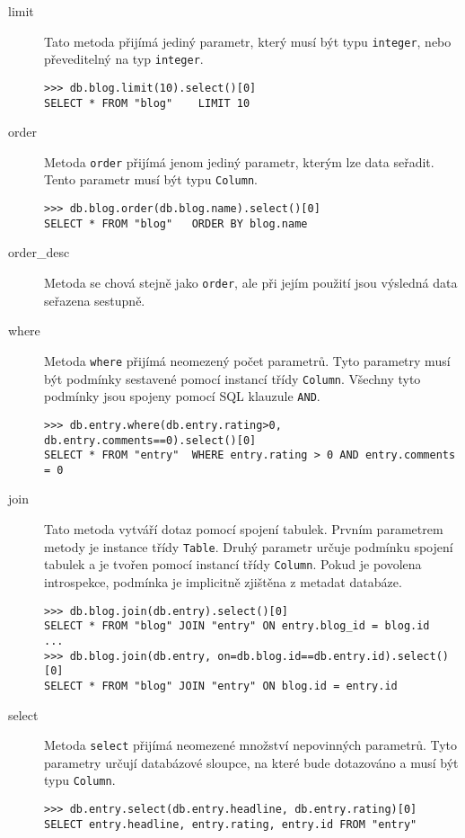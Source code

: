 \documentclass[11pt]{article}
\begin{document}
\begin{description}
\item[limit] Tato metoda přijímá jediný parametr, který musí být typu \lstinline[style=inline]|integer|, nebo převeditelný na typ \lstinline[style=inline]|integer|.
\begin{lstlisting}[style=python]
>>> db.blog.limit(10).select()[0]
SELECT * FROM "blog"    LIMIT 10
\end{lstlisting}
\item[order] Metoda \lstinline[style=inline]|order| přijímá jenom jediný parametr, kterým lze data seřadit. Tento parametr musí být typu \lstinline[style=inline]|Column|. 
\begin{lstlisting}[style=python]
>>> db.blog.order(db.blog.name).select()[0]
SELECT * FROM "blog"   ORDER BY blog.name
\end{lstlisting}
\item[order\_desc] Metoda se chová stejně jako \lstinline[style=inline]|order|, ale při jejím použití jsou výsledná data seřazena sestupně.
\item[where] Metoda \lstinline[style=inline]|where| přijímá neomezený počet parametrů. Tyto parametry musí být podmínky sestavené pomocí instancí třídy \lstinline[style=inline]|Column|. Všechny tyto podmínky jsou spojeny pomocí SQL klauzule \lstinline[style=inline]|AND|.
\begin{lstlisting}[style=python]
>>> db.entry.where(db.entry.rating>0, db.entry.comments==0).select()[0]
SELECT * FROM "entry"  WHERE entry.rating > 0 AND entry.comments = 0
\end{lstlisting}
\item[join] Tato metoda vytváří dotaz pomocí spojení tabulek. Prvním parametrem metody je instance třídy \lstinline[style=inline]|Table|. Druhý parametr určuje podmínku spojení tabulek a je tvořen pomocí instancí třídy \lstinline[style=inline]|Column|. Pokud je povolena introspekce, podmínka je implicitně zjištěna z metadat databáze. 
\begin{lstlisting}[style=python]
>>> db.blog.join(db.entry).select()[0]
SELECT * FROM "blog" JOIN "entry" ON entry.blog_id = blog.id
...
>>> db.blog.join(db.entry, on=db.blog.id==db.entry.id).select()[0]
SELECT * FROM "blog" JOIN "entry" ON blog.id = entry.id
\end{lstlisting}
\item[select] Metoda \lstinline[style=inline]|select| přijímá neomezené množství nepovinných parametrů. Tyto parametry určují databázové sloupce, na které bude dotazováno a musí být typu \lstinline[style=inline]|Column|.
\begin{lstlisting}[style=python]
>>> db.entry.select(db.entry.headline, db.entry.rating)[0]
SELECT entry.headline, entry.rating, entry.id FROM "entry"
\end{lstlisting}
\end{description}
\end{document}
